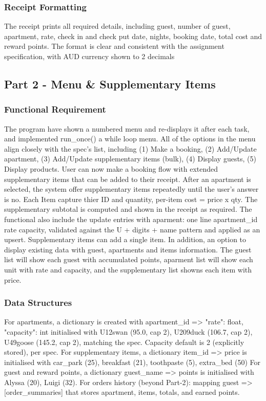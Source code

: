\documentclass[conference]{IEEEtran}
\begin{document}
\subsubsection{Receipt Formatting}
The receipt prints all required details, including guest, number of guest, apartment, rate, check in and check put date, nights, booking date, total cost and reward points. The format is clear and consistent with the assignment specification, with AUD currency shown to 2 decimals

\subsection{Part 2 - Menu \& Supplementary Items}
\subsubsection{Functional Requirement}
The program have shown a numbered menu and re-displays it after each task, and implemented run\_once() a while loop menu. All of the options in the menu align closely with the spec's list, including (1) Make a booking, (2) Add/Update apartment, (3) Add/Update supplementary items (bulk), (4) Display guests, (5) Display products. User can now make a booking flow with extended supplementary items that can be added to their receipt. After an apartment is selected, the system offer supplementary items repeatedly until the user's answer is no. Each Item capture thier ID and quantity, per-item cost = price x qty. The supplementary subtotal is computed and shown in the receipt as required. The functional also include the update entries with aparment: one line apartment\_id rate capacity, validated against the U + digits + name pattern and applied as an upsert. Supplementary items can add a single item. In addition, an option to display existing data with guest, apartments and items information. The guest list will show each guest with accumulated points, aparment list will show each unit with rate and capacity, and the supplementary list showns each item with price.
\subsubsection{Data Structures}
For apartments, a dictionary is created with apartment\_id => {"rate": float, "capacity": int} initialised with U12swan (95.0, cap 2), U209duck (106.7, cap 2), U49goose (145.2, cap 2), matching the spec. Capacity default is 2 (explicitly stored), per spec.
For supplementary items, a dictionary item\_id => price is initialised with car\_park (25), breakfast (21), toothpaste (5), extra\_bed (50)
For guest and reward points, a dictionary guest\_name => points is initialised with Alyssa (20), Luigi (32).
For orders history (beyond Part-2): mapping guest => [order\_summaries] that stores apartment, items, totals, and earned points.
\end{document}
